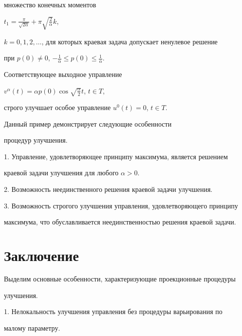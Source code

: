 множество конечных моментов


$t_1=\frac{\pi}{\sqrt{2\alpha}}+\pi\sqrt{\frac{2}{\alpha}}k$,


$k=0,1,2,\dotsc$, для которых краевая задача допускает ненулевое решение


при $p(0)\neq{0}$, ${-}\frac{1}{\alpha}\leq{p}(0)\leq\frac{1}{\alpha}$.


Соответствующее выходное управление


$v^{\alpha}(t)=\alpha{p}(0)\cos{\sqrt{\frac{\alpha}{2}}t}$, $t\in{T}$,


строго улучшает особое управление $u^0(t)=0$, $t\in{T}$.





Данный пример демонстрирует следующие особенности


процедур улучшения.





1. Управление, удовлетворяющее принципу максимума, является решением


краевой задачи улучшения для любого $\alpha>0$.





2. Возможность неединственного решения краевой задачи улучшения.





3. Возможность строгого улучшения управления, удовлетворяющего принципу


максимума, что обуславливается неединственностью решения краевой задачи.








\section{Заключение}





Выделим основные особенности, характеризующие проекционные процедуры


улучшения.





1. Нелокальность улучшения управления без процедуры варьирования по


малому параметру.





